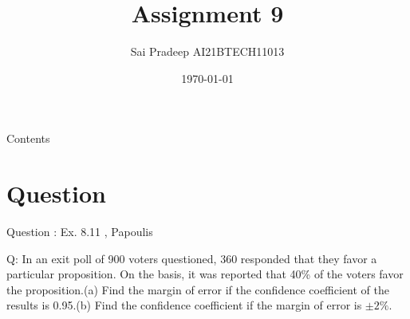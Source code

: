 \documentclass[journal,12pt,twocolumn]{beamer}
\title{Assignment 9}
\author{Sai Pradeep AI21BTECH11013}
\date {\today}
\begin{document}
\begin{frame}
 \maketitle   
\end{frame}

\begin{frame}{Contents}
    \tableofcontents
\end{frame}

\section{Question}
\begin{frame}{Question : Ex. 8.11 , Papoulis}
\begin{block}

Q: In an exit poll of 900 voters questioned, 360 responded that they favor a particular proposition. On the basis, it was reported that 40\% of the voters favor the proposition.(a) Find the margin of error if the confidence coefficient of the results is 0.95.(b) Find the confidence coefficient if the margin of error is $\pm 2 \%$.
\end{block}
\end{frame}
\end{document}
